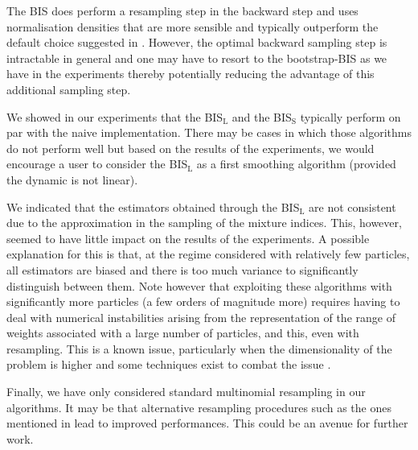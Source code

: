 The BIS does perform a resampling step in the backward step and uses normalisation densities that are more sensible and typically outperform the default choice suggested in \citep{briers10,fearnhead10}.
However, the optimal backward sampling step is intractable in general and one may have to resort to the bootstrap-BIS as we have in the experiments thereby potentially reducing the advantage of this additional sampling step.

We showed in our experiments that the BIS$_{\text{L}}$ and the BIS$_{\text{S}}$ typically perform on par with the naive implementation. There may be cases in which those algorithms do not perform well but based on the results of the experiments, we would encourage a user to consider the BIS$_{\text{L}}$ as a first smoothing algorithm (provided the dynamic is not linear).

We indicated that the estimators obtained through the BIS$_{\text{L}}$ are not consistent due to the approximation in the sampling of the mixture indices. This, however, seemed to have little impact on the results of the experiments. A possible explanation for this is that, at the regime considered with relatively few particles, all estimators are biased and there is too much variance to significantly distinguish between them. Note however that exploiting these algorithms with significantly more particles (a few orders of magnitude more) requires having to deal with numerical instabilities arising from the representation of the range of weights associated with a large number of particles, and this, even with resampling. This is a known issue, particularly when the dimensionality of the problem is higher and some techniques exist to combat the issue \citep{miguez13}. 

Finally, we have only considered standard multinomial resampling in our algorithms. It may be that alternative resampling procedures such as the ones mentioned in \citet{hol06} lead to improved performances. This could be an avenue for further work.



